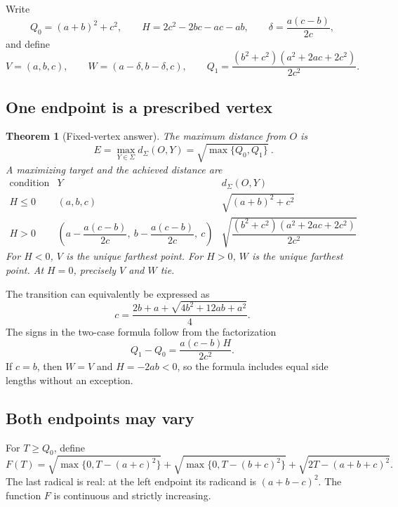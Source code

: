 \documentclass[11pt]{article}
\newtheorem{theorem}{Theorem}[section]
\theoremstyle{definition}
\newcommand{\surf}{\Sigma}
\newcommand{\spq}[1]{\sqrt{\max\{0,#1\}}}
\newcommand{\dist}{d_{\surf}}
\newcommand{\sqzero}{Q_0}
\newcommand{\sqone}{Q_1}
\newcommand{\vertexecc}{E}
\begin{document}
Write
\[
\sqzero=(a+b)^2+c^2,\qquad
H=2c^2-2bc-ac-ab,\qquad
\delta=\frac{a(c-b)}{2c},
\]
and define
\[
V=(a,b,c),\qquad W=(a-\delta,b-\delta,c),\qquad
\sqone=\frac{(b^2+c^2)(a^2+2ac+2c^2)}{2c^2}.
\]

\subsection{One endpoint is a prescribed vertex}

\begin{theorem}[Fixed-vertex answer]\label{thm:vertex}
The maximum distance from \(O\) is
\[
\boxed{\ \vertexecc=\max_{Y\in\surf}\dist(O,Y)
      =\sqrt{\max\{\sqzero,\sqone\}}\ }.
\]
A maximizing target and the achieved distance are
\[
\boxed{
\begin{array}{c|c|c}
\text{condition}&Y&\dist(O,Y)\\ \hline
H\le0&(a,b,c)&\sqrt{(a+b)^2+c^2}\\[2pt]
H>0&
\left(a-\dfrac{a(c-b)}{2c},\
b-\dfrac{a(c-b)}{2c},\ c\right)&
\sqrt{\dfrac{(b^2+c^2)(a^2+2ac+2c^2)}{2c^2}}
\end{array}}
\]
For \(H<0\), \(V\) is the unique farthest point. For \(H>0\), \(W\) is
the unique farthest point. At \(H=0\), precisely \(V\) and \(W\) tie.
\end{theorem}

The transition can equivalently be expressed as
\[
c=\frac{2b+a+\sqrt{4b^2+12ab+a^2}}4.
\]
The signs in the two-case formula follow from the factorization
\begin{equation}\label{eq:vertex-factor}
\sqone-\sqzero=\frac{a(c-b)H}{2c^2}.
\end{equation}
If \(c=b\), then \(W=V\) and \(H=-2ab<0\), so the formula includes
equal side lengths without an exception.

\subsection{Both endpoints may vary}

For \(T\ge\sqzero\), define
\begin{equation}\label{eq:F}
F(T)=\spq{T-(a+c)^2}
    +\spq{T-(b+c)^2}
    +\sqrt{2T-(a+b+c)^2}.
\end{equation}
The last radical is real: at the left endpoint its radicand is
\((a+b-c)^2\). The function \(F\) is continuous and strictly increasing.
\end{document}
